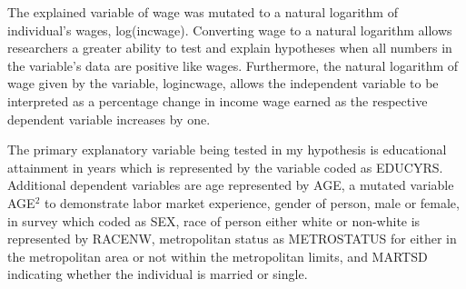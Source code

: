 \documentclass[12pt, English]{article}
\begin{document}
The explained variable of wage was mutated to a natural logarithm of individual’s wages, log(incwage). Converting wage to a natural logarithm allows researchers a greater ability to test and explain hypotheses when all numbers in the variable's data are positive like wages. Furthermore, the natural logarithm of wage given by the variable, logincwage, allows the independent variable to be interpreted as a percentage change in income wage earned as the respective dependent variable increases by one. 

The primary explanatory variable being tested in my hypothesis is educational attainment in years which is represented by the variable coded as EDUCYRS. Additional dependent variables are age represented by AGE, a mutated variable AGE$^2$ to demonstrate labor market experience, gender of person, male or female, in survey which coded as SEX, race of person either white or non-white is represented by RACENW, metropolitan status as METROSTATUS for either in the metropolitan area or not within the metropolitan limits, and MARTSD indicating whether the individual is married or single. 
\end{document}
